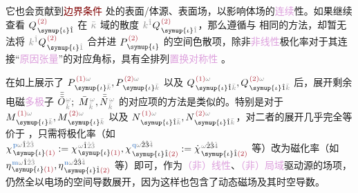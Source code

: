它也会贡献到\textcolor{Maroon}{边界条件}  处的表面/体源、表面场，以影响体场的\textcolor{Plum}{连续}性。如果继续查看 $Q^{\;\! \textcolor{Maroon}{(2)}}_{\;\! \symup{\iota} \hat{1}}$ 在 $\mathcolor{gray}{\bar{\kappa}}$ 域的散度 $\mathcolor{gray}{k^{\hat{1}}} Q^{\;\! \textcolor{Maroon}{(2)}}_{\;\! \symup{\iota} \mathcolor{gray}{\hat{1}}}$，那么遵循与  相同的方法，却暂无法将 $\mathcolor{gray}{k^{\hat{1}}} Q^{\;\! \textcolor{Maroon}{(2)}}_{\;\! \symup{\iota} \mathcolor{gray}{\hat{1}}}$ 合并进 $P^{\;\! \textcolor{Maroon}{(2)}}_{\;\! \symup{\iota}}$ 的空间\textcolor{NavyBlue}{色散}项，除非\textcolor{Plum}{非线性}极化率对于其连接“\textcolor{Plum}{原因张量}”的对应角标，具有全排列\textcolor{Plum}{置换对称性} 。

在如上展示了 $P^{\;\! \textcolor{Maroon}{(1)} \mathcolor{gray}{\omega}}_{\;\! \symup{\iota}\mathcolor{gray}{\bar{k}}}, P^{\;\! \textcolor{Maroon}{(2)} \mathcolor{gray}{\omega}}_{\;\! \symup{\iota}\mathcolor{gray}{\bar{k}}}$ 以及 $Q^{\;\! \textcolor{Maroon}{(1)} \mathcolor{gray}{\omega}}_{\;\! \symup{\iota} \hat{1} \mathcolor{gray}{\bar{k}}}, Q^{\;\! \textcolor{Maroon}{(2)} \mathcolor{gray}{\omega}}_{\;\! \symup{\iota} \hat{1} \mathcolor{gray}{\bar{k}}}$ 后，展开剩余电磁\textcolor{Plum}{多极}子 $\bar{\bar{\bar{O}}}^{\;\!\mathcolor{gray}{\omega}}_{\;\!\mathcolor{gray}{\bar{k}}};$ $ \bar{M}^{\;\!\mathcolor{gray}{\omega}}_{\;\!\mathcolor{gray}{\bar{k}}},\bar{\bar{N}}^{\;\!\mathcolor{gray}{\omega}}_{\;\!\mathcolor{gray}{\bar{k}}}$ 的对应项的方法是类似的。特别是对于 $M^{\;\! \textcolor{Maroon}{(1)} \mathcolor{gray}{\omega}}_{\;\! \symup{\iota}\mathcolor{gray}{\bar{k}}}, M^{\;\! \textcolor{Maroon}{(2)} \mathcolor{gray}{\omega}}_{\;\! \symup{\iota}\mathcolor{gray}{\bar{k}}}$ 以及 $N^{\;\! \textcolor{Maroon}{(1)} \mathcolor{gray}{\omega}}_{\;\! \symup{\iota} \hat{1} \mathcolor{gray}{\bar{k}}}, N^{\;\! \textcolor{Maroon}{(2)} \mathcolor{gray}{\omega}}_{\;\! \symup{\iota} \hat{1} \mathcolor{gray}{\bar{k}}}$，对二者的展开几乎完全等价于 ，只需将极化率（如 $\chi^{\;\! \textcolor{NavyBlue}{\text{p}} \mathcolor{gray}{\omega} \hat{1} \mathcolor{gray}{\hat{2} \hat{3}}}_{\;\! \symup{\iota} \textcolor{Maroon}{(1)}} := \chi^{\;\! \mathcolor{gray}{\omega} \hat{1} \mathcolor{gray}{\hat{2} \hat{3}}}_{\;\! \symup{\iota} \textcolor{Maroon}{(1)}}, \chi^{\;\! \textcolor{NavyBlue}{\text{q}} \mathcolor{gray}{\omega} \hat{2} \hat{3} \mathcolor{gray}{\hat{4}}}_{\;\! \symup{\iota} \hat{1} \textcolor{Maroon}{(2)}} := \dot{\chi}^{\;\! \mathcolor{gray}{\omega} \hat{2} \hat{3} \mathcolor{gray}{\hat{4}}}_{\;\! \symup{\iota} \hat{1} \textcolor{Maroon}{(2)}}$ 等）改为磁化率（如 $\eta^{\;\! \textcolor{NavyBlue}{\text{m}} \mathcolor{gray}{\omega} \hat{1} \mathcolor{gray}{\hat{2} \hat{3}}}_{\;\! \symup{\iota} \textcolor{Maroon}{(1)}}, \eta^{\;\! \textcolor{NavyBlue}{\text{n}} \mathcolor{gray}{\omega} \hat{2} \hat{3} \mathcolor{gray}{\hat{4}}}_{\;\! \symup{\iota} \hat{1} \textcolor{Maroon}{(2)}}$ 等）即可，作为\textcolor{Plum}{（非）线性}、\textcolor{Plum}{（非）局域}\textcolor{NavyBlue}{驱动源}的\textcolor{NavyBlue}{场}项，仍然全以电场的空间导数展开，因为这样也包含了动态磁场及其时空导数\cite{vandendriesscheInfluenceMagneticFields2014}。


